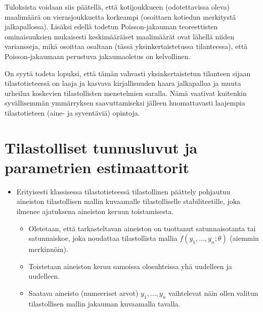\documentclass[
]{book}
\providecommand{\tightlist}{%
  \setlength{\itemsep}{0pt}\setlength{\parskip}{0pt}}
\begin{document}
\begin{eblock}{}
Tuloksista voidaan siis päätellä, että kotijoukkueen (odotettavissa oleva) maalimäärä on vierasjoukkuetta korkeampi (osoittaen kotiedun merkitystä jalkapallossa). Lisäksi edellä todetun Poisson-jakauman teoreettisten ominaisuuksien mukaisesti keskimääräiset maalimäärät ovat lähellä niiden variansseja, mikä osoittaa osaltaan (tässä yksinkertaistetussa tilanteessa), että Poisson-jakaumaan perustuva jakaumaoletus on kelvollinen.

On syytä todeta lopuksi, että tämän vahvasti yksinkertaistetun tilanteen sijaan tilastotieteessä on laaja ja kasvava kirjallisuuden haara jalkapalloa ja muuta urheilua koskevien tilastollisten menetelmien saralla. Nämä vaativat kuitenkin syvällisemmän ymmärryksen saavuttamiseksi jälleen huomattavasti laajempia tilastotieteen (aine- ja syventäviä) opintoja.

\end{eblock}

\hypertarget{alaluku83}{%
\section{Tilastolliset tunnusluvut ja parametrien estimaattorit}\label{alaluku83}}

\begin{itemize}
\tightlist
\item
  Erityisesti klassisessa tilastotieteessä tilastollinen päättely pohjautuu aineiston tilastollisen mallin kuvaamalle tilastolliselle stabiliteetille, joka ilmenee ajatuksena aineiston keruun toistamisesta.

  \begin{itemize}
  \tightlist
  \item
    Oletetaan, että tarkasteltavan aineiston on tuottanut satunnaisotanta tai satunnaiskoe, joka noudattaa tilastollista mallia \(f(y_1, \ldots, y_n; \theta)\) (aiemmin merkinnöin).
  \item
    Toistetaan aineiston keruu samoissa olosuhteissa yhä uudelleen ja uudelleen.
  \item
    Saatava aineisto (numeeriset arvot) \(y_1, \ldots, y_n\) vaihtelevat näin ollen valitun tilastollisen mallin jakauman kuvaamalla tavalla.
  \end{itemize}
\end{itemize}
\end{document}
